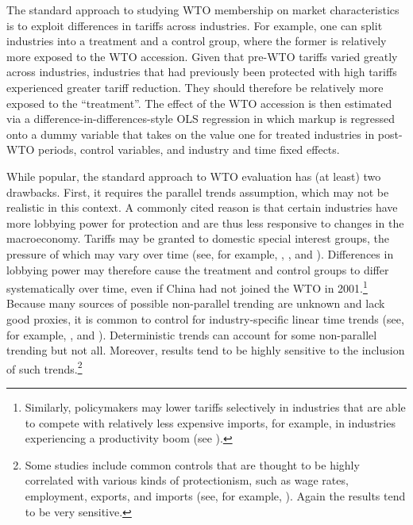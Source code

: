 \documentclass[12pt,fleqn]{article}
\begin{document}
  The standard approach to studying WTO membership on market characteristics is to exploit differences in tariffs across industries. For example, one can split industries into a treatment and a control group, where the former is relatively more exposed to the WTO accession. Given that pre-WTO tariffs varied greatly across industries, industries that had previously been protected with high tariffs experienced greater tariff reduction. They should therefore be relatively more exposed to the ``treatment''. The effect of the WTO accession is then estimated via a difference-in-differences-style OLS regression in which markup is regressed onto a dummy variable that takes on the value one for treated industries in post-WTO periods, control variables, and industry and time fixed effects.
  
  While popular, the standard approach to WTO evaluation has (at least) two drawbacks. First, it requires the parallel trends assumption, which may not be realistic in this context. A commonly cited reason is that certain industries have more lobbying power for protection and are thus less responsive to changes in the macroeconomy. Tariffs may be granted to domestic special interest groups, the pressure of which may vary over time (see, for example, \citealp{Fan_etal_2018}, \citealp{Deng_etal_2018}, and \citealp{Xiang_etal_2017}). Differences in lobbying power may therefore cause the treatment and control groups to differ systematically over time, even if China had not joined the WTO in 2001.\footnote{Similarly, policymakers may lower tariffs selectively in industries that are able to compete with relatively less expensive imports, for example, in industries experiencing a productivity boom (see \citealp{Brandt_etal_2017}).} Because many sources of possible non-parallel trending are unknown and lack good proxies, it is common to control for industry-specific linear time trends (see, for example, \citealp{Liu_Qiu_2016}, and \citealp{Mao_Xu_2019}). Deterministic trends can account for some non-parallel trending but not all. Moreover, results tend to be highly sensitive to the inclusion of such trends.\footnote{Some studies include common controls that are thought to be highly correlated with various kinds of protectionism, such as wage rates, employment, exports, and imports (see, for example, \citealp{Hsu_etal_2020}). Again the results tend to be very sensitive.}
  
\end{document}
